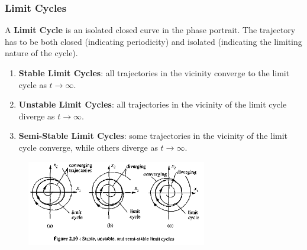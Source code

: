 \documentclass[11pt,handout]{beamer}   %
\begin{document}
\begin{frame}
\begin{columns}
\begin{column}{0.5\textwidth}
\begin{figure}
\end{figure}
\end{column}
\end{columns}
\end{frame}

\begin{frame}
\frametitle{Limit Cycles}
\small
A \textbf{Limit Cycle} is an isolated closed curve in the phase portrait. The trajectory has to be both closed (indicating periodicity) and isolated (indicating the limiting nature of the cycle).
\begin{enumerate}
\item \textbf{Stable Limit Cycles}: all trajectories in the vicinity converge to the limit cycle as $t \rightarrow \infty$.
\item \textbf{Unstable Limit Cycles}: all trajectories in the vicinity of the limit cycle diverge as $t \rightarrow \infty$.
\item \textbf{Semi-Stable Limit Cycles}: some trajectories in the vicinity of the limit cycle converge, while others diverge as $t \rightarrow \infty$.
\end{enumerate}
\begin{figure}
\centering
\includegraphics[width=0.7\textwidth]{Figures/Limit_Cycles.PNG}
\end{figure}
\end{frame}
\end{document}
